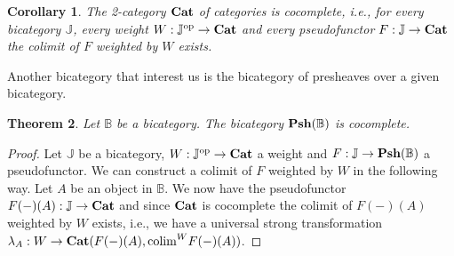 \documentclass[12pt,oneside,reqno,a4paper]{article}
\newtheorem{theorem}{Theorem}[section]
\newtheorem{corollary}[theorem]{Corollary}
\theoremstyle{definition}
\newcommand{\op}{^\textup{op}}
\newcommand{\Cat}{\textbf{\textup{Cat}}}
\newcommand{\Psh}[1]{\textbf{\textup{Psh}}(#1)}
\newcommand{\bB}{\mathbb{B}}
\newcommand{\bJ}{\mathbb{J}}
\newcommand{\colim}{\textup{colim}}
\begin{document}
\begin{corollary} \label{catcc}
The 2-category $\Cat$ of categories is cocomplete, i.e., for every bicategory $\bJ$, every weight $W:\bJ\op\to\Cat$ and every pseudofunctor $F:\bJ\to\Cat$ the colimit of $F$ weighted by $W$ exists.
\end{corollary}

Another bicategory that interest us is the bicategory of presheaves over a given bicategory.

\begin{theorem} \label{PshCocomp}
Let $\bB$ be a bicategory. The bicategory $\Psh{\bB}$ is cocomplete.
\end{theorem}

\begin{proof}
Let $\bJ$ be a bicategory, $W:\bJ\op\to\Cat$ a weight and $F:\bJ\to\Psh{\bB}$ a pseudofunctor. We can construct a colimit of $F$ weighted by $W$ in the following way. Let $A$ be an object in $\bB$. We now have the pseudofunctor $F(-)(A):\bJ\to\Cat$ and since $\Cat$ is cocomplete the colimit of $F(-)(A)$ weighted by $W$ exists, i.e., we have a universal strong transformation $\lambda_A:W\to \Cat(F(-)(A),\colim^W F(-)(A))$.


\end{proof}
\end{document}
